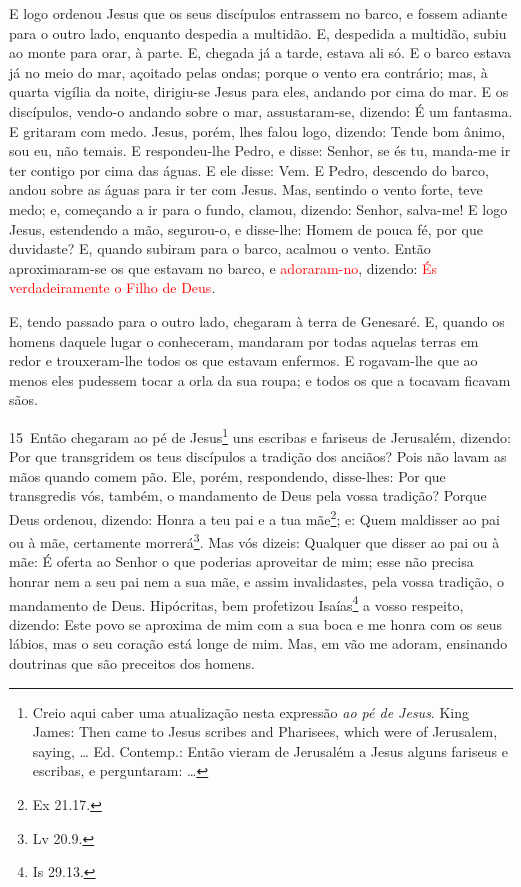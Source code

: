 E logo ordenou Jesus que os seus discípulos entrassem no barco, e
fossem adiante para o outro lado, enquanto despedia a multidão.
E, despedida a multidão, subiu ao monte para orar, à parte.
E, chegada já a tarde, estava ali só. E o barco estava já no
meio do mar, açoitado pelas ondas; porque o vento era contrário;
mas, à quarta vigília da noite, dirigiu-se Jesus para eles,
andando por cima do mar. E os discípulos, vendo-o andando
sobre o mar, assustaram-se, dizendo: É um fantasma. E gritaram com
medo. Jesus, porém, lhes falou logo, dizendo: Tende bom
ânimo, sou eu, não temais. E respondeu-lhe Pedro, e disse:
Senhor, se és tu, manda-me ir ter contigo por cima das águas.
E ele disse: Vem. E Pedro, descendo do barco, andou sobre as
águas para ir ter com Jesus. Mas, sentindo o vento forte,
teve medo; e, começando a ir para o fundo, clamou, dizendo: Senhor,
salva-me! E logo Jesus, estendendo a mão, segurou-o, e
disse-lhe: Homem de pouca fé, por que duvidaste? E, quando
subiram para o barco, acalmou o vento. Então aproximaram-se
os que estavam no barco, e \textcolor{red}{adoraram-no}, dizendo: \textcolor{red}{És
verdadeiramente o Filho de Deus}.

E, tendo passado para o outro lado, chegaram à terra de Genesaré.
E, quando os homens daquele lugar o conheceram, mandaram por
todas aquelas terras em redor e trouxeram-lhe todos os que estavam
enfermos. E rogavam-lhe que ao menos eles pudessem tocar a
orla da sua roupa; e todos os que a tocavam ficavam sãos.

\medskip

\lettrine{15}\ Então chegaram ao pé de Jesus\footnote{Creio
aqui caber uma atualização nesta expressão \emph{ao pé de Jesus}.
King James: Then came to Jesus scribes and Pharisees, which were of
Jerusalem, saying, \ldots{} Ed. Contemp.: Então vieram de Jerusalém
a Jesus alguns fariseus e escribas, e perguntaram: \dots{}} uns
escribas e fariseus de Jerusalém, dizendo: Por que transgridem
os teus discípulos a tradição dos anciãos? Pois não lavam as mãos
quando comem pão. Ele, porém, respondendo, disse-lhes: Por que
transgredis vós, também, o mandamento de Deus pela vossa tradição?
Porque Deus ordenou, dizendo: Honra a teu pai e a tua
mãe\footnote{Ex 21.17.}; e: Quem maldisser ao pai ou à mãe,
certamente morrerá\footnote{Lv 20.9.}. Mas vós dizeis: Qualquer
que disser ao pai ou à mãe: É oferta ao Senhor o que poderias
aproveitar de mim; esse não precisa honrar nem a seu pai nem a sua
mãe, e assim invalidastes, pela vossa tradição, o mandamento de
Deus. Hipócritas, bem profetizou Isaías\footnote{Is 29.13.} a
vosso respeito, dizendo: Este povo se aproxima de mim com a sua
boca e me honra com os seus lábios, mas o seu coração está longe de
mim. Mas, em vão me adoram, ensinando doutrinas que são
preceitos dos homens.

